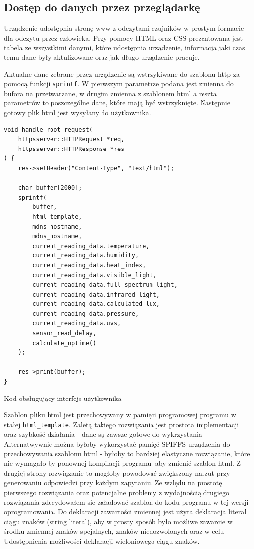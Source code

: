 \documentclass[12pt,a4paper]{article}
\begin{document}
\subsection{Dostęp do danych przez przeglądarkę}

Urządzenie udostępnia stronę www z odczytami czujników w prostym formacie dla odczytu przez człowieka. 
Przy pomocy HTML oraz CSS prezentowana jest tabela ze wszystkimi danymi, które udostępnia urządzenie, informacja jaki czas temu
dane były aktulizowane oraz jak długo urządzenie pracuje.

Aktualne dane zebrane przez urządzenie są wstrzykiwane do szablonu http za pomocą funkcji \texttt{sprintf}. W pierwszym parametrze podana jest
zmienna do bufora na przetwarzane, w drugim zmienna z szablonem html a reszta parametrów to poszczególne dane, które mają być wstrzyknięte.
Następnie gotowy plik html jest wysyłany do użytkownika.

\begin{code}[H]
\begin{verbatim}
void handle_root_request(
    httpsserver::HTTPRequest *req, 
    httpsserver::HTTPResponse *res
) {
    res->setHeader("Content-Type", "text/html");

    char buffer[2000];
    sprintf(
        buffer, 
        html_template,
        mdns_hostname,
        mdns_hostname,
        current_reading_data.temperature,
        current_reading_data.humidity,
        current_reading_data.heat_index,
        current_reading_data.visible_light,
        current_reading_data.full_spectrum_light,
        current_reading_data.infrared_light,
        current_reading_data.calculated_lux,
        current_reading_data.pressure,
        current_reading_data.uvs,
        sensor_read_delay,
        calculate_uptime()
    );

    res->print(buffer);
}
\end{verbatim}
\caption{Kod obsługujący interfejs użytkownika}
\label{user-interface-code}
\end{code}

Szablon pliku html jest przechowywany w pamięci programowej programu w stałej \texttt{html\_template}. Zaletą takiego rozwiązania jest prostota implementacji
oraz szybkość działania - dane są zawsze gotowe do wykrzystania. Alternatwywnie można byłoby wykorzystać pamięć SPIFFS urządzenia do przechowywania szablonu
html - byłoby to bardziej elastyczne rozwiązanie, które nie wymagało by ponownej kompilacji programu, aby zmienić szablon html. Z drugiej strony rozwiązanie to
mogłoby powodować zwiększony narzut przy generowaniu odpowiedzi przy każdym zapytaniu. Ze wzlędu na prostotę pierwszego rozwiązania oraz potencjalne
problemy z wydajnością drugiego rozwiązania zdecydowałem sie załadować szablon do kodu programu w tej wersji oprogramowania.
Do deklaracji zawartości zmiennej jest użyta deklaracja literał ciągu znaków (string literal), aby w prosty sposób było możliwe zawarcie w środku 
zmiennej znaków spcjalnych, znaków niedozwolonych oraz w celu Udostępnienia możliwości deklaracji wieloniowego ciągu znaków.
\end{document}
